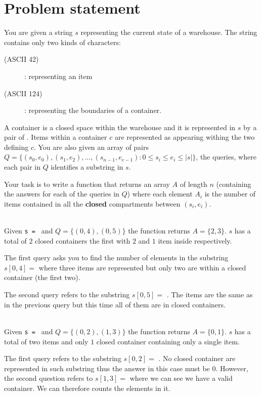 \section{Problem statement}
\begin{exercise}
	You are given a string $s$ representing the current state of a warehouse. 
	The string contains only two kinds of characters: 
	\begin{description}
		\item[\bsq{\textbf{\texttt{*}}}(ASCII 42)]: representing an item 
		\item[\bsq{\textbf{\texttt{|}}}(ASCII 124)]: representing the boundaries of a container.
	\end{description}
	
	A container is a closed space within the warehouse and it is represented in $s$ by a pair of  \bsq{\texttt{|}}.
	Items within a container $c$ are represented as \bsq{\texttt{*}} appearing withing the two \bsq{\texttt{|}} defining $c$.
	You are also given an array of pairs $Q = \{(s_0, e_0),(s_1, e_2),\ldots,(s_{n-1}, e_{e-1}) : 0 \leq s_i \leq e_i \leq |s|\}$, 
	the queries, where each pair in $Q$ identifies a substring in $s$.
	
	Your task is to write a function that returns an array $A$ of length $n$ 
	(containing the answers for each of the queries in $Q$)
	where each element $A_i$ is the number of items contained in all the \textbf{closed} compartments between $(s_i, e_i)$.
	

\begin{example}
	\hfill \\
	Given \texttt{s = \bsq{|**|*|*}} and $Q = \{(0,4),(0,5)\}$ the function returns $A=\{2,3\}$.
	$s$ has a total of $2$ closed containers the first with $2$ and $1$ item inside respectively.
	
	The first query asks you to find the number of elements in the substring $s[0,4]=$ \texttt{\bsq{|**|*}} 
	where three items are represented but only two are within a closed container (the first two).
	
	The second query refers to the substring $s[0,5]=$ \texttt{\bsq{|**|*|}}. The items are the same as in the previous query but this time
	all of them are in closed containers.
	
\end{example}

\begin{example}
	\hfill \\
	Given \texttt{s = \bsq{*|*|}} and $Q = \{(0,2),(1,3)\}$ the function returns $A=\{0,1\}$.
	$s$ has a total of two items and only $1$ closed container containing only a single item.

	The first query refers to the substring $s[0,2]=$ \texttt{\bsq{*|*}}. No closed container are represented in such substring thus the answer in this case must be $0$.
	However, the second question refers to  $s[1,3]=$ \texttt{\bsq{|*|}} where we can see we have a valid container. We can therefore counts the elements in it.
\end{example}

\end{exercise}
